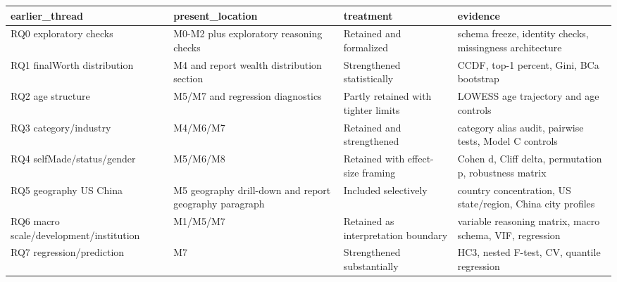 \begin{tabular}{llll}
\toprule
earlier\_thread & present\_location & treatment & evidence \\
\midrule
RQ0 exploratory checks & M0-M2 plus exploratory reasoning checks & Retained and formalized & schema freeze, identity checks, missingness architecture \\
RQ1 finalWorth distribution & M4 and report wealth distribution section & Strengthened statistically & CCDF, top-1 percent, Gini, BCa bootstrap \\
RQ2 age structure & M5/M7 and regression diagnostics & Partly retained with tighter limits & LOWESS age trajectory and age controls \\
RQ3 category/industry & M4/M6/M7 & Retained and strengthened & category alias audit, pairwise tests, Model C controls \\
RQ4 selfMade/status/gender & M5/M6/M8 & Retained with effect-size framing & Cohen d, Cliff delta, permutation p, robustness matrix \\
RQ5 geography US China & M5 geography drill-down and report geography paragraph & Included selectively & country concentration, US state/region, China city profiles \\
RQ6 macro scale/development/institution & M1/M5/M7 & Retained as interpretation boundary & variable reasoning matrix, macro schema, VIF, regression \\
RQ7 regression/prediction & M7 & Strengthened substantially & HC3, nested F-test, CV, quantile regression \\
\bottomrule
\end{tabular}

